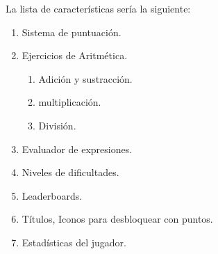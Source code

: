 \documentclass{article}
\begin{document}
La lista de características sería la siguiente:
\begin{enumerate}
	\item Sistema de puntuación.
	\item Ejercicios de Aritmética.
	\begin{enumerate}
		\item Adición y sustracción.
		\item multiplicación.
		\item División.
	\end{enumerate}
	\item Evaluador de expresiones.
	\item Niveles de dificultades.
	\item Leaderboards.
	\item Títulos, Iconos para desbloquear con puntos.
	\item Estadísticas del jugador.
\end{enumerate}
\pagebreak
\end{document}
